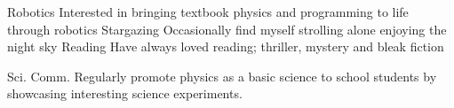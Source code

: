 

\begin{cvskills}
\cvskill
	{Robotics} %
	{Interested in bringing textbook physics and programming to life through robotics} %
\cvskill
    {Stargazing} %
    {Occasionally find myself strolling alone enjoying the night sky} %
\cvskill
{Reading} %
{Have always loved reading; thriller, mystery and bleak fiction} %

\cvskill
{Sci. Comm.}
{Regularly promote physics as a basic science to school students by showcasing interesting science experiments.}

\end{cvskills}